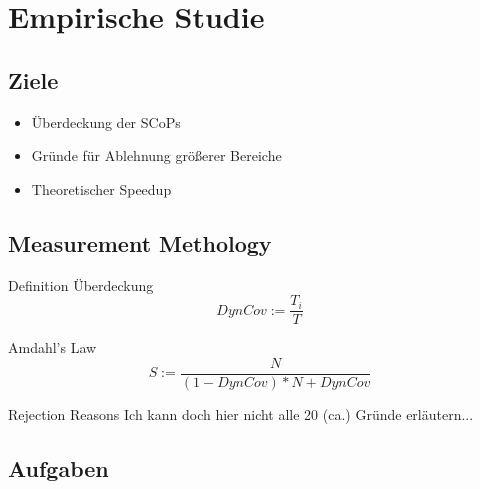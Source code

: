\documentclass[aspectratio=169, xcolor=dvipsnames]{beamer}
\begin{document}
\section{Empirische Studie}
\subsection{Ziele}
\begin{frame}{\subsecname}
    \begin{itemize}
        \item Überdeckung der SCoPs
        \item Gründe für Ablehnung größerer Bereiche
        \item Theoretischer Speedup
    \end{itemize}
\end{frame}
\subsection{Measurement Methology}
\begin{frame}{Definition Überdeckung}
    \Huge{\[DynCov := \frac{T_i}{T}\]}
\end{frame}
\begin{frame}{Amdahl's Law}
    \Huge{\[S := \frac{N}{(1-DynCov)*N+DynCov}\]}
\end{frame}
\begin{frame}{Rejection Reasons}
    Ich kann doch hier nicht alle 20 (ca.) Gründe erläutern...
\end{frame}
\subsection{Aufgaben}
\begin{frame}{\subsecname}
\end{frame}
\end{document}
